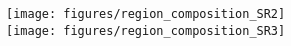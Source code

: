 

\begin{figure}[h!]
  \begin{center}
    \texttt{[image: figures/region\_composition\_SR2]} \\
    \texttt{[image: figures/region\_composition\_SR3]}
    \label{fig:fit_region_composition}
  \end{center}
\end{figure}




\begin{table}[ht!]
  \centering
  
  \label{tab:fit_result_sr}
\end{table}




